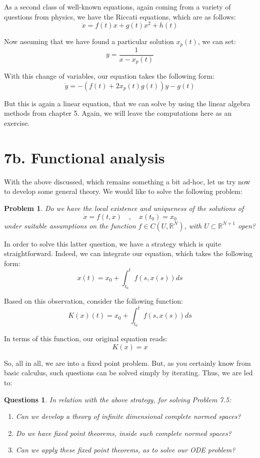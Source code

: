 \documentclass[12pt]{amsbook}
\newtheorem{problem}[theorem]{Problem}
\newtheorem{questions}[theorem]{Questions}
\begin{document}
As a second class of well-known equations, again coming from a variety of questions from physics, we have the Riccati equations, which are as follows:
$$\dot{x}=f(t)x+g(t)x^2+h(t)$$

Now assuming that we have found a particular solution $x_p(t)$, we can set:
$$y=\frac{1}{x-x_p(t)}$$

With this change of variables, our equation takes the following form:
$$\dot{y}=-(f(t)+2x_p(t)g(t))y-g(t)$$

But this is again a linear equation, that we can solve by using the linear algebra methods from chapter 5. Again, we will leave the computations here as an exercise.

\section*{7b. Functional analysis}

With the above discussed, which remains something a bit ad-hoc, let us try now to develop some general theory. We would like to solve the following problem:

\begin{problem}
Do we have the local existence and uniqueness of the solutions of
$$\dot{x}=f(t,x)\quad,\quad x(t_0)=x_0$$
under suitable assumptions on the function $f\in C(U,\mathbb R^N)$, with $U\subset\mathbb R^{N+1}$ open?
\end{problem}

In order to solve this latter question, we have a strategy which is quite straightforward. Indeed, we can integrate our equation, which takes the following form:
$$x(t)=x_0+\int_{t_0}^tf(s,x(s))ds$$

Based on this observation, consider the following function:
$$K(x)(t)=x_0+\int_{t_0}^tf(s,x(s))ds$$

In terms of this function, our original equation reads:
$$K(x)=x$$

So, all in all, we are into a fixed point problem. But, as you certainly know from basic calculus, such questions can be solved simply by iterating. Thus, we are led to:

\begin{questions}
In relation with the above strategy, for solving Problem 7.5:
\begin{enumerate}
\item Can we develop a theory of infinite dimensional complete normed spaces?

\item Do we have fixed point theorems, inside such complete normed spaces?

\item Can we apply these fixed point theorems, as to solve our ODE problem?
\end{enumerate}
\end{questions}
\end{document}
